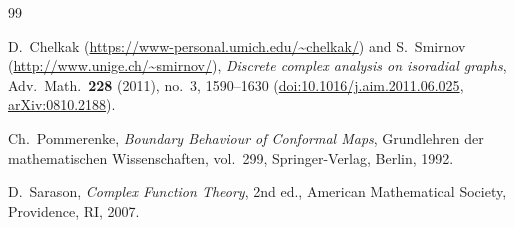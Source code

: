 \documentclass[11pt,reqno]{amsart}
\numberwithin{equation}{section}
\begin{document}
\begin{thebibliography}{99}

 D.~Chelkak (\url{https://www-personal.umich.edu/~chelkak/}) and S.~Smirnov (\url{http://www.unige.ch/~smirnov/}), {\em Discrete complex analysis on isoradial graphs}, Adv.\ Math.\ \textbf{228} (2011), no.~3, 1590--1630 (\href{https://doi.org/10.1016/j.aim.2011.06.025}{doi:10.1016/j.aim.2011.06.025}, \href{https://arxiv.org/abs/0810.2188}{arXiv:0810.2188}).

 Ch.~Pommerenke, {\em Boundary Behaviour of Conformal Maps\/}, Grundlehren der mathematischen Wissenschaften, vol.~299, Springer-Verlag, Berlin, 1992.

 D.~Sarason, {\em Complex Function Theory\/}, 2nd ed., American Mathematical Society, Providence, RI, 2007.

\end{thebibliography}
\end{document}
